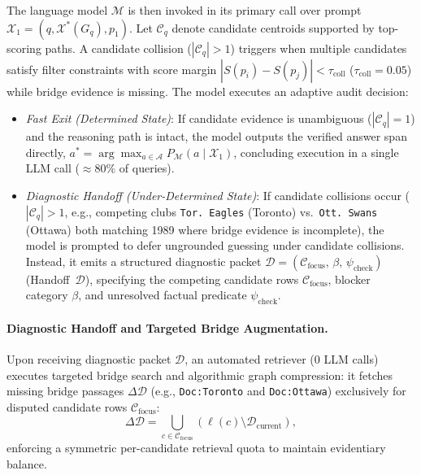 \documentclass[runningheads]{llncs}
\begin{document}
\enlargethispage{4.5\baselineskip}
The language model $\mathcal{M}$ is then invoked in its primary call over prompt $\mathcal{X}_1 = (q, \mathcal{X}^*(G_q), p_1)$. Let $\mathcal{C}_q$ denote candidate centroids supported by top-scoring paths. A candidate collision ($|\mathcal{C}_q| > 1$) triggers when multiple candidates satisfy filter constraints with score margin $|S(p_i) - S(p_j)| < \tau_{\text{coll}}$ ($\tau_{\text{coll}} = 0.05$) while bridge evidence is missing. The model executes an adaptive audit decision:
\begin{itemize}[leftmargin=1.5em]
    \item \emph{Fast Exit (Determined State)}: If candidate evidence is unambiguous ($|\mathcal{C}_q| = 1$) and the reasoning path is intact, the model outputs the verified answer span directly, $a^* = \arg\max_{a \in \mathcal{A}} P_{\mathcal{M}}(a \mid \mathcal{X}_1)$, concluding execution in a single LLM call ($\approx 80\%$ of queries).
    \item \emph{Diagnostic Handoff (Under-Determined State)}: If candidate collisions occur ($|\mathcal{C}_q| > 1$, e.g., competing clubs \texttt{Tor. Eagles} (Toronto) vs.\ \texttt{Ott. Swans} (Ottawa) both matching 1989 where bridge evidence is incomplete), the model is prompted to defer ungrounded guessing under candidate collisions. Instead, it emits a structured diagnostic packet $\mathcal{D} = (\mathcal{C}_{\text{focus}}, \, \beta, \, \psi_{\text{check}})$ (Handoff~$\mathcal{D}$), specifying the competing candidate rows $\mathcal{C}_{\text{focus}}$, blocker category $\beta$, and unresolved factual predicate $\psi_{\text{check}}$.
\end{itemize}

\paragraph{Diagnostic Handoff and Targeted Bridge Augmentation.}
Upon receiving diagnostic packet $\mathcal{D}$, an automated retriever (0 LLM calls) executes targeted bridge search and algorithmic graph compression: it fetches missing bridge passages $\Delta\mathcal{D}$ (e.g., \texttt{Doc:Toronto} and \texttt{Doc:Ottawa}) exclusively for disputed candidate rows $\mathcal{C}_{\text{focus}}$:
\begin{equation}
\label{eq:targeted-retrieval}
\Delta \mathcal{D} = \bigcup_{c \in \mathcal{C}_{\text{focus}}} \left( \ell(c) \setminus \mathcal{D}_{\text{current}} \right),
\end{equation}
enforcing a symmetric per-candidate retrieval quota to maintain evidentiary balance.
\end{document}
